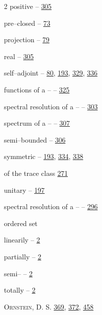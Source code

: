 \begin{multicols}{2}
\hspace*{1.1em}positive -- \hyperlink{page.305}{305}\par
\hspace*{1.1em}pre--closed -- \hyperlink{page.73}{73}\par
\hspace*{1.1em}projection -- \hyperlink{page.79}{79}\par
\hspace*{1.1em}real -- \hyperlink{page.305}{305}\par
\hspace*{1.1em}self--adjoint -- \hyperlink{page.80}{80}, \hyperlink{page.193}{193}, \hyperlink{page.329}{329}, \hyperlink{page.336}{336}\par
\hspace*{2.2em}functions of a -- -- \hyperlink{page.325}{325}\par
\hspace*{2.2em}spectral resolution of a -- -- \hyperlink{page.303}{303}\par
\hspace*{2.2em}spectrum of a -- -- \hyperlink{page.307}{307}\par
\hspace*{1.1em}semi--bounded -- \hyperlink{page.306}{306}\par
\hspace*{1.1em}symmetric -- \hyperlink{page.193}{193}, \hyperlink{page.334}{334}, \hyperlink{page.338}{338}\par
\hspace*{1.1em}of the trace class \hyperlink{page.271}{271}\par
\hspace*{1.1em}unitary -- \hyperlink{page.197}{197}\par
\hspace*{2.2em}spectral resolution of a -- -- \hyperlink{page.296}{296}\par
\noindent ordered set\par
\hspace*{1.1em}linearily -- \hyperlink{page.2}{2}\par
\hspace*{1.1em}partially -- \hyperlink{page.2}{2}\par
\hspace*{1.1em}semi-- -- \hyperlink{page.2}{2}\par
\hspace*{1.1em}totally -- \hyperlink{page.2}{2}\par
\noindent \textsc{Ornstein}, D. S. \hyperlink{page.369}{369}, \hyperlink{page.372}{372}, \hyperlink{page.458}{458}\par

\end{multicols}
